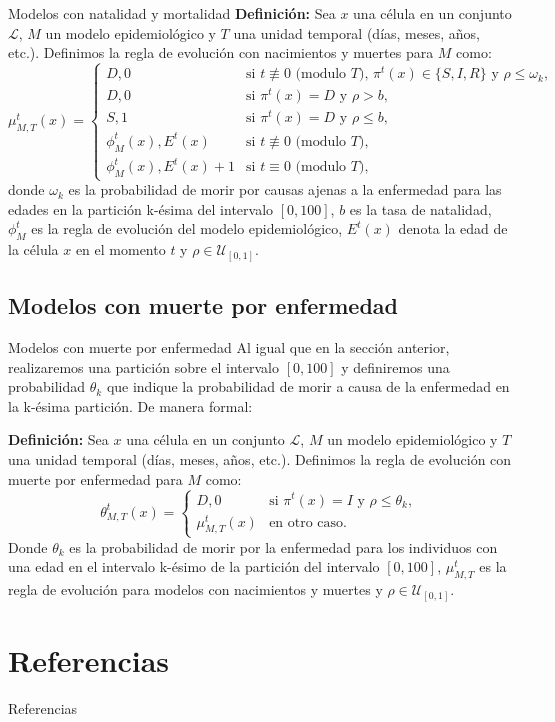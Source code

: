 \documentclass[9pt]{beamer}
\begin{document}
\begin{frame}{Modelos con natalidad y mortalidad}
\textbf{Definición:} Sea $x$ una célula en un conjunto $\mathcal{L}$, $M$ un modelo epidemiológico y $T$ una unidad temporal (días, meses, años, etc.). Definimos la regla de evolución con nacimientos y muertes para $M$ como:
\begin{equation}
    \mu_{M,T}^t(x)=\left\{\begin{array}{ll}
        D,0 & \text{si }t\not\equiv 0 \text{ (modulo }T\text{), }\pi^t(x)\in\{S,I,R\}\text{ y }\rho\leq\omega_k, \\
        D,0 & \text{si }\pi^t(x)=D\text{ y }\rho>b,\\
        S,1 & \text{si }\pi^t(x)=D\text{ y }\rho\leq b,\\
        \phi_M^t(x),E^t(x) & \text{si }t\not\equiv 0 \text{ (modulo }T),\\
        \phi_M^t(x),E^t(x)+1 & \text{si }t\equiv 0 \text{ (modulo }T),
    \end{array}\right.
\end{equation}
donde $\omega_k$ es la probabilidad de morir por causas ajenas a la enfermedad para las edades en la partición k-ésima del intervalo $[0,100]$, $b$ es la tasa de natalidad, $\phi_M^t$ es la regla de evolución del modelo epidemiológico, $E^t(x)$ denota la edad de la célula $x$ en el momento $t$ y $\rho\in\mathcal{U}_{[0,1]}$.
\end{frame}

\subsection{Modelos con muerte por enfermedad}
\begin{frame}{Modelos con muerte por enfermedad}
Al igual que en la sección anterior, realizaremos una partición sobre el intervalo $[0,100]$ y definiremos una probabilidad $\theta_k$ que indique la probabilidad de morir a causa de la enfermedad en la k-ésima partición. De manera formal:

\textbf{Definición:} Sea $x$ una célula en un conjunto $\mathcal{L}$, $M$ un modelo epidemiológico y $T$ una unidad temporal (días, meses, años, etc.). Definimos la regla de evolución con muerte por enfermedad para $M$ como:
\begin{equation}
    \theta_{M,T}^t(x)=\left\{\begin{array}{ll}
        D,0 & \text{si }\pi^t(x)=I\text{ y }\rho\leq\theta_k, \\
        \mu_{M,T}^t(x) & \text{en otro caso.}
    \end{array}\right.
\end{equation}
Donde $\theta_k$ es la probabilidad de morir por la enfermedad para los individuos con una edad en el intervalo k-ésimo de la partición del intervalo $[0,100]$, $\mu_{M,T}^t$ es la regla de evolución para modelos con nacimientos y muertes y $\rho\in\mathcal{U}_{[0,1]}$.
\end{frame}

\section{Referencias}
\begin{frame}[allowframebreaks]{Referencias}

\end{frame}
\end{document}
